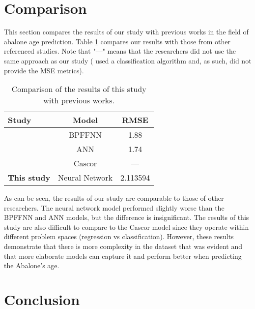 \documentclass[12pt]{article}
\begin{document}
\section{Comparison}

This section compares the results of our study with previous works in the field of abalone age prediction. Table \ref{tab:comparison} compares our results with those from other referenced studies. Note that "—" means that the researchers did not use the same approach as our study (\cite{wang_abalone_nodate} used a classification algorithm and, as such, did not provide the MSE metrics).

\begin{table}[h]
	\centering
	\begin{tabular}{lcc}
		\toprule
		Study                         & Model          & RMSE     \\
		\midrule
		\cite{djeddi_abalone_2022}    & BPFFNN         & 1.88     \\
		\cite{misman_prediction_2019} & ANN            & 1.74     \\
		\cite{wang_abalone_nodate}    & Cascor         & —        \\
		\textbf{This study}           & Neural Network & 2.113594 \\
		\bottomrule
	\end{tabular}
	\caption{Comparison of the results of this study with previous works.}
	\label{tab:comparison}
\end{table}

As can be seen, the results of our study are comparable to those of other researchers. The neural network model performed slightly worse than the BPFFNN and ANN models, but the difference is insignificant. The results of this study are also difficult to compare to the Cascor model since they operate within different problem spaces (regression vs classification). However, these results demonstrate that there is more complexity in the dataset that was evident and that more elaborate models can capture it and perform better when predicting the Abalone's age.

\section{Conclusion}
\end{document}
